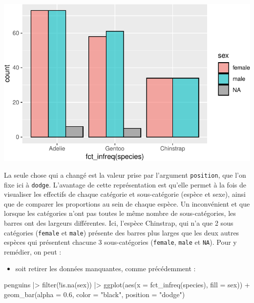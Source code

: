 \documentclass[
  a4paper,
  DIV=11,
  numbers=noendperiod,
  oneside]{scrreprt}
\newenvironment{Shaded}{}{}
\newcommand{\AttributeTok}[1]{\textcolor[rgb]{0.84,0.23,0.29}{#1}}
\newcommand{\FloatTok}[1]{\textcolor[rgb]{0.00,0.36,0.77}{#1}}
\newcommand{\FunctionTok}[1]{\textcolor[rgb]{0.44,0.26,0.76}{#1}}
\newcommand{\NormalTok}[1]{\textcolor[rgb]{0.14,0.16,0.18}{#1}}
\newcommand{\SpecialCharTok}[1]{\textcolor[rgb]{0.00,0.36,0.77}{#1}}
\newcommand{\StringTok}[1]{\textcolor[rgb]{0.01,0.18,0.38}{#1}}
\providecommand{\tightlist}{%
  \setlength{\itemsep}{0pt}\setlength{\parskip}{0pt}}\usepackage{longtable,booktabs,array}
\begin{document}
\includegraphics{03-visualization_files/figure-pdf/unnamed-chunk-58-1.pdf}

La seule chose qui a changé est la valeur prise par l'argument
\texttt{position}, que l'on fixe ici à \texttt{dodge}. L'avantage de
cette représentation est qu'elle permet à la fois de visualiser les
effectifs de chaque catégorie et sous-catégorie (espèce et sexe), ainsi
que de comparer les proportions au sein de chaque espèce. Un
inconvénient et que lorsque les catégories n'ont pas toutes le même
nombre de sous-catégories, les barres ont des largeurs différentes. Ici,
l'espèce Chinstrap, qui n'a que 2 sous catégories (\texttt{female} et
\texttt{male}) présente des barres plus larges que les deux autres
espèces qui présentent chacune 3 sous-catégories (\texttt{female},
\texttt{male} et \texttt{NA}). Pour y remédier, on peut :

\begin{itemize}
\tightlist
\item
  soit retirer les données manquantes, comme précédemment :
\end{itemize}

\begin{Shaded}
\begin{Highlighting}[]
\NormalTok{penguins }\SpecialCharTok{|\textgreater{}} 
  \FunctionTok{filter}\NormalTok{(}\SpecialCharTok{!}\FunctionTok{is.na}\NormalTok{(sex)) }\SpecialCharTok{|\textgreater{}} 
  \FunctionTok{ggplot}\NormalTok{(}\FunctionTok{aes}\NormalTok{(}\AttributeTok{x =} \FunctionTok{fct\_infreq}\NormalTok{(species), }\AttributeTok{fill =}\NormalTok{ sex)) }\SpecialCharTok{+}
  \FunctionTok{geom\_bar}\NormalTok{(}\AttributeTok{alpha =} \FloatTok{0.6}\NormalTok{, }\AttributeTok{color =} \StringTok{"black"}\NormalTok{, }\AttributeTok{position =} \StringTok{"dodge"}\NormalTok{)}
\end{Highlighting}
\end{Shaded}
\end{document}
